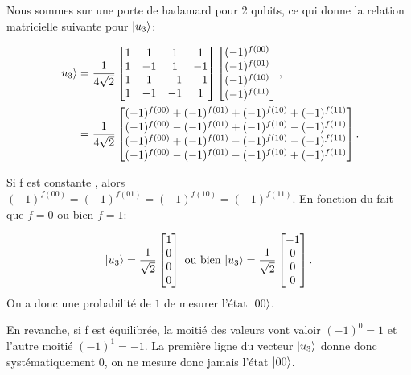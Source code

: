 \documentclass[12pt,a4paper]{article}
\DeclarePairedDelimiter\ket{\lvert}{\rangle}
\begin{document}
Nous sommes sur une porte de hadamard pour 2 qubits, ce qui donne
la relation matricielle suivante pour $\ket{u_3}$:

\begin{align}
\ket{u_3} &=
\frac{1}{4\sqrt{2}} 
\begin{bmatrix}
  1 & 1 & 1 & 1 \\
  1 & -1 & 1 & -1 \\
  1 & 1 & -1 & -1 \\
  1 & -1 & -1 & 1 \\
\end{bmatrix}
\begin{bmatrix}
  (-1)^{f(00)} \\ (-1)^{f(01)} \\ (-1)^{f(10)} \\ (-1)^{f(11)}
\end{bmatrix} , \\ 
 &= \frac{1}{4\sqrt{2}} 
\begin{bmatrix}
  (-1)^{f(00)} + (-1)^{f(01)} + (-1)^{f(10)} + (-1)^{f(11)} \\
  (-1)^{f(00)} - (-1)^{f(01)} + (-1)^{f(10)} - (-1)^{f(11)} \\
  (-1)^{f(00)} + (-1)^{f(01)} - (-1)^{f(10)} - (-1)^{f(11)} \\
  (-1)^{f(00)} - (-1)^{f(01)} - (-1)^{f(10)} + (-1)^{f(11)} \\
\end{bmatrix}.
\end{align}

Si f est constante , alors
$(-1)^{f(00)} = (-1)^{f(01)} = (-1)^{f(10)} = (-1)^{f(11)}$. En
fonction du fait que $f=0$ ou bien $f=1$:

\begin{equation}
  \label{eq:6}
\ket{u_3}=
\frac{1}{\sqrt{2}} 
\begin{bmatrix}
  1 \\ 0 \\ 0 \\ 0
\end{bmatrix}  \text{ ou bien }
\ket{u_3}=
\frac{1}{\sqrt{2}} 
\begin{bmatrix}
  -1 \\ 0 \\ 0 \\ 0
\end{bmatrix}.
\end{equation}
On a donc une probabilité de $1$ de mesurer l'état $\ket{00}$.


En revanche, si f est équilibrée, la moitié des valeurs vont
valoir $(-1)^{0} = 1$ et l'autre moitié $(-1)^{1} = -1$. La première
ligne du vecteur $\ket{u_3}$ donne donc systématiquement 0, on ne mesure donc
jamais l'état $\ket{00}$.
\end{document}
